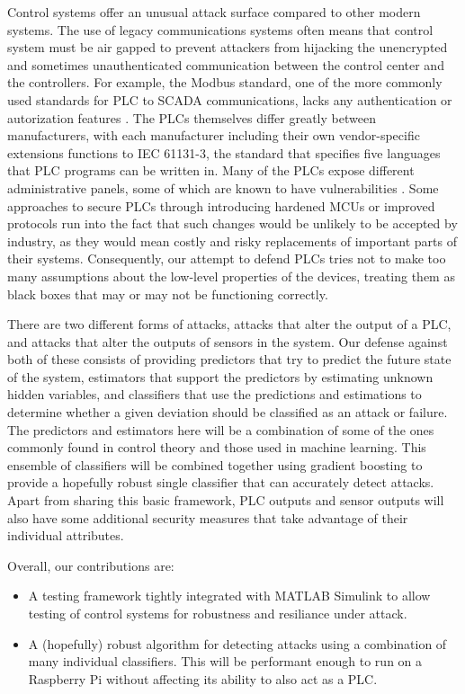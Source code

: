 \documentclass[10pt,twocolumn]{IEEEtran}
\begin{document}
Control systems offer an unusual attack surface compared to other modern systems.
The use of legacy communications systems often means that control system must be air gapped to prevent attackers from hijacking the unencrypted and sometimes unauthenticated communication between the control center and the controllers.
For example, the Modbus standard, one of the more commonly used standards for PLC to SCADA communications, lacks any authentication or autorization features \cite{modbus}.
The PLCs themselves differ greatly between manufacturers, with each manufacturer including their own vendor-specific extensions functions to IEC 61131-3, the standard that specifies five languages that PLC programs can be written in.
Many of the PLCs expose different administrative panels, some of which are known to have vulnerabilities \cite{metasploit}.
Some approaches to secure PLCs through introducing hardened MCUs or improved protocols run into the fact that such changes would be unlikely to be accepted by industry, as they would mean costly and risky replacements of important parts of their systems.
Consequently, our attempt to defend PLCs tries not to make too many assumptions about the low-level properties of the devices, treating them as black boxes that may or may not be functioning correctly.

There are two different forms of attacks, attacks that alter the output of a PLC, and attacks that alter the outputs of sensors in the system.
Our defense against both of these consists of providing predictors that try to predict the future state of the system, estimators that support the predictors by estimating unknown hidden variables, and classifiers that use the predictions and estimations to determine whether a given deviation should be classified as an attack or failure.
The predictors and estimators here will be a combination of some of the ones commonly found in control theory and those used in machine learning.
This ensemble of classifiers will be combined together using gradient boosting to provide a hopefully robust single classifier that can accurately detect attacks.
Apart from sharing this basic framework, PLC outputs and sensor outputs will also have some additional security measures that take advantage of their individual attributes.

Overall, our contributions are:
\begin{itemize}
\item A testing framework tightly integrated with MATLAB Simulink to allow testing of control systems for robustness and resiliance under attack.
\item A (hopefully) robust algorithm for detecting attacks using a combination of many individual classifiers.
  This will be performant enough to run on a Raspberry Pi without affecting its ability to also act as a PLC.
\end{itemize}
\end{document}
